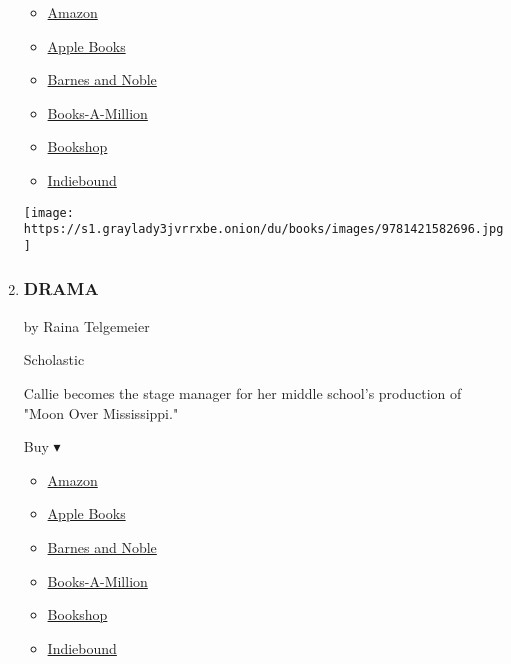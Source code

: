 \begin{enumerate}
  \begin{itemize}
  \tightlist
  \item
    \href{http://www.amazon.com/My-Hero-Academia-Vol-1/dp/1421582694?tag=NYTBS-20}{Amazon}
  \item
    \href{https://du-gae-books-dot-nyt-du-prd.appspot.com/buy?title=MY+HERO+ACADEMIA\%2C+VOL.+1\&author=Kohei+Horikoshi}{Apple
    Books}
  \item
    \href{https://www.anrdoezrs.net/click-7990613-11819508?url=https\%3A\%2F\%2Fwww.barnesandnoble.com\%2Fw\%2F\%3Fean\%3D9781421582696}{Barnes
    and Noble}
  \item
    \href{https://www.anrdoezrs.net/click-7990613-35140?url=https\%3A\%2F\%2Fwww.booksamillion.com\%2Fp\%2FMY\%2BHERO\%2BACADEMIA\%252C\%2BVOL.\%2B1\%2FKohei\%2BHorikoshi\%2F9781421582696}{Books-A-Million}
  \item
    \href{https://bookshop.org/a/3546/9781421582696}{Bookshop}
  \item
    \href{https://www.indiebound.org/book/9781421582696?aff=NYT}{Indiebound}
  \end{itemize}

  \texttt{[image: https://s1.graylady3jvrrxbe.onion/du/books/images/9781421582696.jpg]}
\item
  \hypertarget{drama}{%
  \subsubsection{DRAMA}\label{drama}}

  by Raina Telgemeier

  Scholastic

  Callie becomes the stage manager for her middle school's production of
  "Moon Over Mississippi."

  Buy ▾

  \begin{itemize}
  \tightlist
  \item
    \href{http://www.amazon.com/Drama-Raina-Telgemeier/dp/0545326990?tag=NYTBS-20}{Amazon}
  \item
    \href{https://du-gae-books-dot-nyt-du-prd.appspot.com/buy?title=DRAMA\&author=Raina+Telgemeier}{Apple
    Books}
  \item
    \href{https://www.anrdoezrs.net/click-7990613-11819508?url=https\%3A\%2F\%2Fwww.barnesandnoble.com\%2Fw\%2F\%3Fean\%3D9780545326995}{Barnes
    and Noble}
  \item
    \href{https://www.anrdoezrs.net/click-7990613-35140?url=https\%3A\%2F\%2Fwww.booksamillion.com\%2Fp\%2FDRAMA\%2FRaina\%2BTelgemeier\%2F9780545326995}{Books-A-Million}
  \item
    \href{https://bookshop.org/a/3546/9780545326995}{Bookshop}
  \item
    \href{https://www.indiebound.org/book/9780545326995?aff=NYT}{Indiebound}
  \end{itemize}


\end{enumerate}
